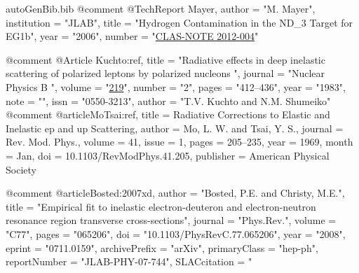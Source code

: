 \begin{filecontents*}{autoGenBib.bib}
@comment %
@TechReport{ Mayer,
	author = "M. Mayer",
	institution = "JLAB",
	title = "{Hydrogen Contamination in the ND_3 Target for EG1b}",
	year = "2006",
	number = "\href{https://misportal.jlab.org/ul/Physics/Hall-B/clas/index.cfm?note\_year=2012}{CLAS-NOTE 2012-004}"
}

@comment %
@Article{ Kuchto:ref,
	title = "Radiative effects in deep inelastic scattering of polarized leptons by polarized nucleons ",
	journal = "Nuclear Physics B ",
	volume = "\href{http://www.sciencedirect.com/science/article/pii/0550321383906508}{219}",
	number = "2",
	pages = "412--436",
	year = "1983",
	note = "",
	issn = "0550-3213",
	author = "{T.V. Kuchto and N.M. Shumeiko}"
}
@comment %
@article{MoTsai:ref,
  title = {Radiative Corrections to Elastic and Inelastic $\mathrm{ep}$ and $\mathrm{up}$ Scattering},
  author = {Mo, L. W. and Tsai, Y. S.},
  journal = {Rev. Mod. Phys.},
  volume = {41},
  issue = {1},
  pages = {205--235},
  year = {1969},
  month = {Jan},
  doi = {10.1103/RevModPhys.41.205},
  publisher = {American Physical Society}
}


@comment %
@article{Bosted:2007xd,
      author         = "Bosted, P.E. and Christy, M.E.",
      title          = "{Empirical fit to inelastic electron-deuteron and
                        electron-neutron resonance region transverse
                        cross-sections}",
      journal        = "Phys.Rev.",
      volume         = "C77",
      pages          = "065206",
      doi            = "10.1103/PhysRevC.77.065206",
      year           = "2008",
      eprint         = "0711.0159",
      archivePrefix  = "arXiv",
      primaryClass   = "hep-ph",
      reportNumber   = "JLAB-PHY-07-744",
      SLACcitation   = "%
}




\end{filecontents*}
